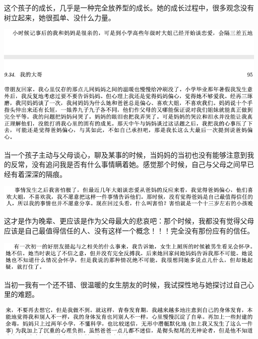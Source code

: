 \documentclass[9pt, b5paper]{article}
\begin{document}
这个孩子的成长，几乎是一种完全放养型的成长。她的成长过程中，很多观念没有树立起来，她很孤单、没什么力量。 

\begin{center}
\includegraphics[width=.9\linewidth]{./pic/backups_plans_20210422_094911.png}
\end{center}

当一个孩子主动与父母谈心，聊及某事的时候，当妈妈的当初也没有能够注意到我的反常，没有追问我是否有什么事情瞒着她。感觉那个时候，自己与父母之间早已经有着深深的隔痕。

\begin{center}
\includegraphics[width=.9\linewidth]{./pic/backups_plans_20210422_101554.png}
\end{center}

这才是作为晚辈、更应该是作为父母最大的悲哀吧：那个时候，我都没有觉得父母应该是自己最值得信任的人、没有这样一个概念！！！完全没有那份应有的信任。

\begin{center}
\includegraphics[width=.9\linewidth]{./pic/backups_plans_20210422_094753.png}
\end{center}

当初一我有一个还不错、很温暖的女生朋友的时候，我试探性地与她探讨过自己心里的难题。

\begin{center}
\includegraphics[width=.9\linewidth]{./pic/backups_plans_20210422_101717.png}
\end{center}
\end{document}
